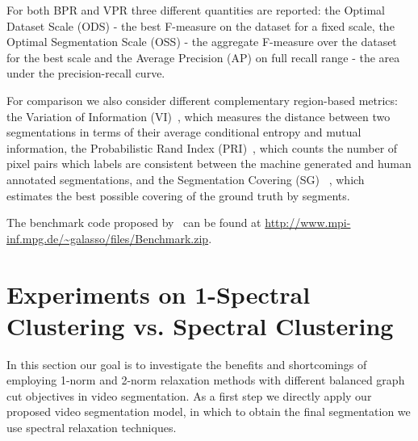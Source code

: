 For both BPR and VPR  three different quantities are reported: the Optimal Dataset Scale (ODS) - the best F-measure on the dataset for a fixed scale, the Optimal Segmentation Scale (OSS) - the aggregate F-measure over the dataset for 
the best scale and the Average Precision (AP) on full recall range - the area under the precision-recall curve. %

For comparison we also consider different complementary region-based metrics: the Variation of Information (VI)~\cite{Meila05}, which measures the distance between two segmentations in terms of their average conditional entropy and mutual information, the 
Probabilistic Rand Index (PRI)~\cite{rand1971, UnnikrishnanPH07}, which counts the number of pixel pairs which labels are consistent between the machine generated and human annotated segmentations, and the Segmentation Covering (SG)
~\cite{Arbelaez09}, which estimates the best possible covering of the ground truth by segments.  

The benchmark code proposed by~\cite{Galasso13} can be found at  \url{http://www.mpi-inf.mpg.de/~galasso/files/Benchmark.zip}.
\section{Experiments on 1-Spectral Clustering vs. Spectral Clustering}
\label{sec:ch4_1sc_vs_sc}
In this section our goal is to investigate the benefits and shortcomings of employing 1-norm and 2-norm relaxation methods with different balanced graph cut objectives in video segmentation.
As a first step we directly apply our proposed video segmentation model, in which to obtain the final segmentation we use spectral relaxation techniques. 
% 

